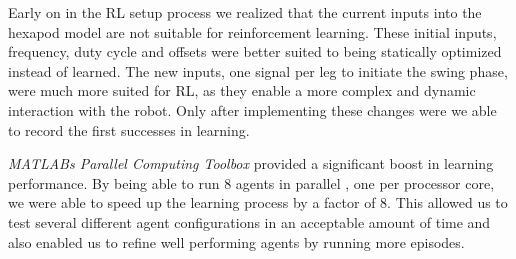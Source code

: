Early on in the RL setup process we realized that the current inputs into the hexapod model are not suitable for reinforcement learning.
These initial inputs, frequency, duty cycle and offsets were better suited to being statically optimized instead of learned.
The new inputs, one signal per leg to initiate the swing phase, were much more suited for RL, as they enable a more complex and dynamic interaction with the robot.
Only after implementing these changes were we able to record the first successes in learning.


\textit{MATLABs Parallel Computing Toolbox} provided a significant boost in learning performance.
By being able to run 8 agents in parallel , one per processor core, we were able to speed up the learning process by a factor of 8.
This allowed us to test several different agent configurations in an acceptable amount of time and also enabled us to refine well performing agents by running more episodes.




